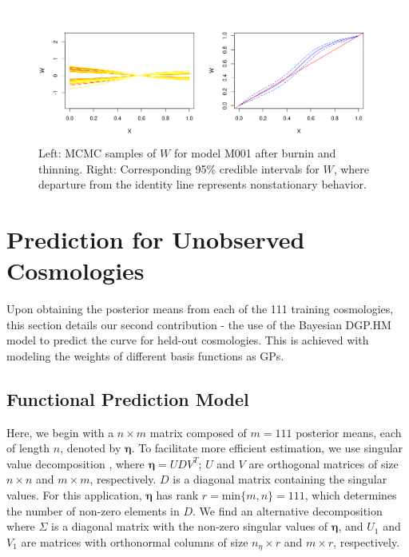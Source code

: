 \documentclass[11pt]{article}
\begin{document}
\begin{figure}[ht]
   \centering
   \includegraphics[width=6in]{plot_warp_M001.png}
   \caption{Left: MCMC samples of $W$ for model M001 after burnin and thinning. 
            Right: Corresponding 95\% credible intervals for $W$, where departure 
            from the identity line represents nonstationary behavior.}
   \label{fig:plot_warp}
\end{figure}

\section{Prediction for Unobserved Cosmologies}
\label{sec:pred}

Upon obtaining the posterior means from each of the 111 training cosmologies, this 
section details our second contribution - the use of the Bayesian DGP.HM model 
to predict the curve for held-out cosmologies. This is achieved with modeling the 
weights of different basis functions as GPs.

\subsection{Functional Prediction Model}
\label{subsec:pca}

Here, we begin with a $n \times m$ matrix composed of $m=111$ posterior means, 
each of length $n$, denoted by $\boldsymbol\eta$. To facilitate more efficient estimation, 
we use singular value decomposition \citep[SVD; e.g.,][]{banerjee2014linear}, 
where $\boldsymbol\eta = UDV^T$; $U$ and $V$ are orthogonal matrices of size $n \times n$ 
and $m\times m$, respectively. $D$ is a diagonal matrix containing the singular values. 
For this application, $\boldsymbol\eta$ has rank $r=\text{min}\{m,n\}=111$, which 
determines the number of non-zero elements in $D$. We find an alternative decomposition 
where $\Sigma$ is a diagonal matrix with the non-zero singular values of $\boldsymbol\eta$, 
and $U_1$ and $V_1$ are matrices with orthonormal columns of size $n_\eta \times r$ 
and $m \times r$, respectively. 
\end{document}
